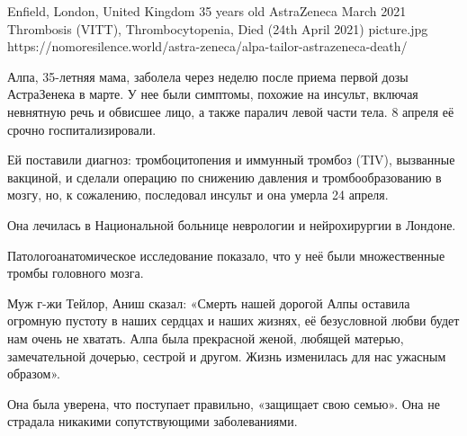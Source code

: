 {Enfield, London, United Kingdom}
{35 years old}
{AstraZeneca}
{March 2021}
{Thrombosis (VITT), Thrombocytopenia, Died (24th April 2021)}
{picture.jpg}
{https://nomoresilence.world/astra-zeneca/alpa-tailor-astrazeneca-death/}
{

Алпа, 35-летняя мама, заболела через неделю после приема первой дозы АстраЗенека
в марте. У нее были симптомы, похожие на инсульт, включая невнятную речь и
обвисшее лицо, а также паралич левой части тела. 8 апреля её срочно
госпитализировали.

Ей поставили диагноз: тромбоцитопения и иммунный тромбоз (TIV), вызванные
вакциной, и сделали операцию по снижению давления и тромбообразованию в мозгу,
но, к сожалению, последовал инсульт и она умерла 24 апреля.

Она лечилась в Национальной больнице неврологии и нейрохирургии в Лондоне.

Патологоанатомическое исследование показало, что у неё были множественные тромбы головного мозга.

Муж г-жи Тейлор, Аниш сказал: «Смерть нашей дорогой Алпы оставила огромную
пустоту в наших сердцах и наших жизнях, её безусловной любви будет нам очень не
хватать. Алпа была прекрасной женой, любящей матерью, замечательной дочерью,
сестрой и другом. Жизнь изменилась для нас ужасным образом».

Она была уверена, что поступает правильно, «защищает свою семью». Она не
страдала никакими сопутствующими заболеваниями.

}
